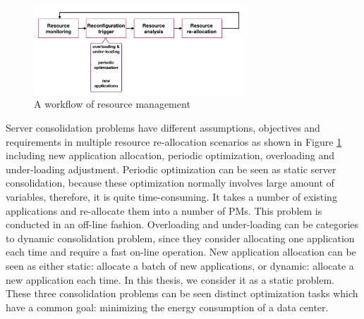 \begin{figure}
	\centering
	\includegraphics[width=0.7\textwidth]{pics/workflow_management.png}
	\caption{A workflow of resource management \cite{Mishra:2012kx}}
	\label{fig:workflow}
\end{figure}

Server consolidation problems have different assumptions, objectives and requirements in multiple resource re-allocation scenarios as shown in Figure \ref{fig:workflow} including new application allocation, periodic optimization, overloading and under-loading adjustment.
Periodic optimization can be seen as static server consolidation, because these optimization normally involves large amount of variables, therefore, it is quite time-consuming. It takes a number of existing applications and re-allocate them into a number of PMs. This problem is conducted in an off-line fashion. Overloading and under-loading can be categories to dynamic consolidation problem, since they consider allocating one application each time and require a fast on-line operation. New application allocation can be seen as either static: allocate a batch of new applications, or dynamic: allocate a new application each time. In this thesis, we consider it as a static problem. These three consolidation problems can be seen distinct optimization tasks which have a common goal: minimizing the energy consumption of a data center. 





